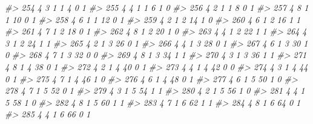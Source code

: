 \documentclass[]{book}
\newenvironment{Shaded}{\begin{snugshade}}{\end{snugshade}}
\newcommand{\CommentTok}[1]{\textcolor[rgb]{0.56,0.35,0.01}{\textit{#1}}}
\begin{document}
\begin{Shaded}
\begin{Highlighting}[]
\CommentTok{#> 254     4         3         1     1     4           0            1}
\CommentTok{#> 255     4         4         1     1     6           1            0}
\CommentTok{#> 256     4         2         1     1     8           0            1}
\CommentTok{#> 257     4         8         1     1    10           0            1}
\CommentTok{#> 258     4         6         1     1    12           0            1}
\CommentTok{#> 259     4         2         1     2    14           1            0}
\CommentTok{#> 260     4         6         1     2    16           1            1}
\CommentTok{#> 261     4         7         1     2    18           0            1}
\CommentTok{#> 262     4         8         1     2    20           1            0}
\CommentTok{#> 263     4         4         1     2    22           1            1}
\CommentTok{#> 264     4         3         1     2    24           1            1}
\CommentTok{#> 265     4         2         1     3    26           0            1}
\CommentTok{#> 266     4         4         1     3    28           0            1}
\CommentTok{#> 267     4         6         1     3    30           1            0}
\CommentTok{#> 268     4         7         1     3    32           0            0}
\CommentTok{#> 269     4         8         1     3    34           1            1}
\CommentTok{#> 270     4         3         1     3    36           1            1}
\CommentTok{#> 271     4         8         1     4    38           0            1}
\CommentTok{#> 272     4         2         1     4    40           0            1}
\CommentTok{#> 273     4         4         1     4    42           0            0}
\CommentTok{#> 274     4         3         1     4    44           0            1}
\CommentTok{#> 275     4         7         1     4    46           1            0}
\CommentTok{#> 276     4         6         1     4    48           0            1}
\CommentTok{#> 277     4         6         1     5    50           1            0}
\CommentTok{#> 278     4         7         1     5    52           0            1}
\CommentTok{#> 279     4         3         1     5    54           1            1}
\CommentTok{#> 280     4         2         1     5    56           1            0}
\CommentTok{#> 281     4         4         1     5    58           1            0}
\CommentTok{#> 282     4         8         1     5    60           1            1}
\CommentTok{#> 283     4         7         1     6    62           1            1}
\CommentTok{#> 284     4         8         1     6    64           0            1}
\CommentTok{#> 285     4         4         1     6    66           0            1}

\end{Highlighting}
\end{Shaded}
\end{document}
